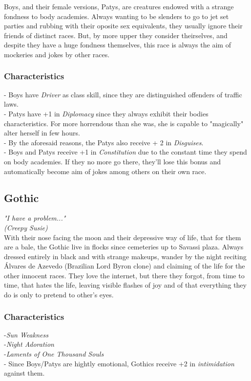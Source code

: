 \documentclass[ letterpaper,12pt]{article}
\begin{document}
Boys, and their female versions, Patys, are creatures endowed with a strange fondness to body academies. Always wanting to be slenders to go to jet set parties and rubbing with their oposite sex equivalents, they usually ignore their friends of distinct races. But, by more upper they consider theirselves, and despite they have a huge fondness themselves, this race is always the aim of mockeries and jokes by other races.\\

\subsubsection{Characteristics}
- Boys have {\it Driver} as class skill, since they are distinguished offenders of traffic laws.\\
- Patys have +1 in {\it Diplomacy} since they always exhibit their bodies characteristics. For more horrendous than she was, she is capable to "magically" alter herself in few hours.\\
- By the aforesaid reasons, the Patys also receive + 2 in {\it Disguises}.\\
- Boys and Patys receive +1 in {\it Constitution} due to the constant time they spend on body academies. If they no more go there, they'll lose this bonus and automatically become aim of jokes among others on their own race.\\

\subsection{Gothic}
{\it "I have a problem..."
\\(Creepy Susie)}\\

With their nose facing the moon and their depressive way of life, that for them are a bale, the Gothic live in flocks since cemeteries up to Savassi plaza.  Always dressed entirely in black and with strange makeups, wander by the night reciting Álvares de Azevedo (Brazilian Lord Byron clone) and claiming of the life for the other innocent races. They love the internet, but there they forgot, from time to time, that hates the life, leaving visible flashes of joy and of that everything they do is only to pretend to other's eyes. 

\subsubsection{Characteristics}
-{\it Sun Weakness}\\
-{\it Night Adoration}\\
-{\it Laments of One Thousand Souls}\\
- Since Boys/Patys are hightly emotional, Gothics receive +2 in {\it intimidation} against them.
\end{document}
